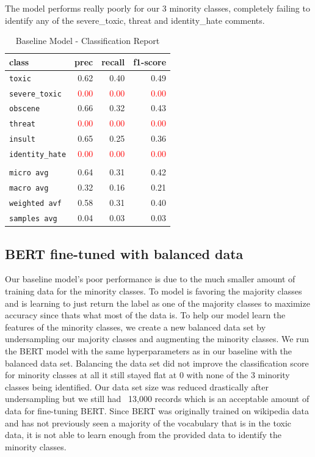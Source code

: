\documentclass[11pt,a4paper]{article}
\begin{document}
The model performs really poorly for our 3 minority classes, completely failing to identify any of the severe\_toxic, threat and identity\_hate comments.

\begin{table}
\centering
\begin{tabular}{lrrr}
\hline
\textbf{class} & \textbf{prec} & \textbf{recall} & \textbf{f1-score}\\
\hline
\verb|toxic| & 0.62 & 0.40 & 0.49 \\
\verb|severe_toxic| & \textcolor{red}{0.00} & \textcolor{red}{0.00} & \textcolor{red}{0.00} \\
\verb|obscene| & 0.66 & 0.32 & 0.43 \\
\verb|threat| & \textcolor{red}{0.00} & \textcolor{red}{0.00} & \textcolor{red}{0.00} \\
\verb|insult| & 0.65 & 0.25 & 0.36 \\
\verb|identity_hate| & \textcolor{red}{0.00} & \textcolor{red}{0.00} & \textcolor{red}{0.00} \\
\vspace{2\baselineskip}\\
\verb|micro avg| & 0.64 & 0.31 & 0.42 \\
\verb|macro avg| & 0.32 & 0.16 & 0.21 \\
\verb|weighted avf| & 0.58 & 0.31 & 0.40 \\
\verb|samples avg| & 0.04 & 0.03 & 0.03 \\
\hline
\end{tabular}
\caption{Baseline Model - Classification Report}
\end{table}

\subsection{BERT fine-tuned with balanced data}
Our baseline model's poor performance is due to the much smaller amount of training data for the minority classes. To model is favoring the majority classes and is learning to just return the label as one of the majority classes to maximize accuracy since thats what most of the data is. To help our model learn the features of the minority classes, we create a new balanced data set by undersampling our majority classes and augmenting the minority classes. We run the BERT model with the same hyperparameters as in our baseline with the balanced data set.
Balancing the data set did not improve the classification score for minority classes at all it still stayed flat at 0 with none of the 3 minority classes being identified. Our data set size was reduced drastically after undersampling but we still had ~13,000 records which is an acceptable amount of data for fine-tuning BERT.
Since BERT was originally trained on wikipedia data and has not previously seen a majority of the vocabulary that is in the toxic data, it is not able to learn enough from the provided data to identify the minority classes. 
\end{document}
